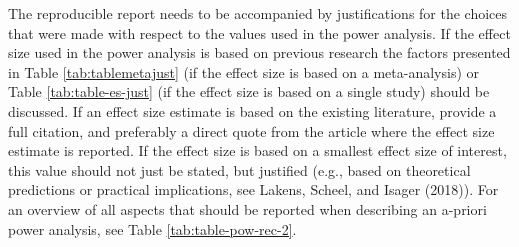 \documentclass[
  english,
  ,jou, a4paper,floatsintext]{apa6}
\begin{document}
The reproducible report needs to be accompanied by justifications for the choices that were made with respect to the values used in the power analysis. If the effect size used in the power analysis is based on previous research the factors presented in Table \ref{tab:tablemetajust} (if the effect size is based on a meta-analysis) or Table \ref{tab:table-es-just} (if the effect size is based on a single study) should be discussed. If an effect size estimate is based on the existing literature, provide a full citation, and preferably a direct quote from the article where the effect size estimate is reported. If the effect size is based on a smallest effect size of interest, this value should not just be stated, but justified (e.g., based on theoretical predictions or practical implications, see Lakens, Scheel, and Isager (2018)). For an overview of all aspects that should be reported when describing an a-priori power analysis, see Table \ref{tab:table-pow-rec-2}.
\end{document}
